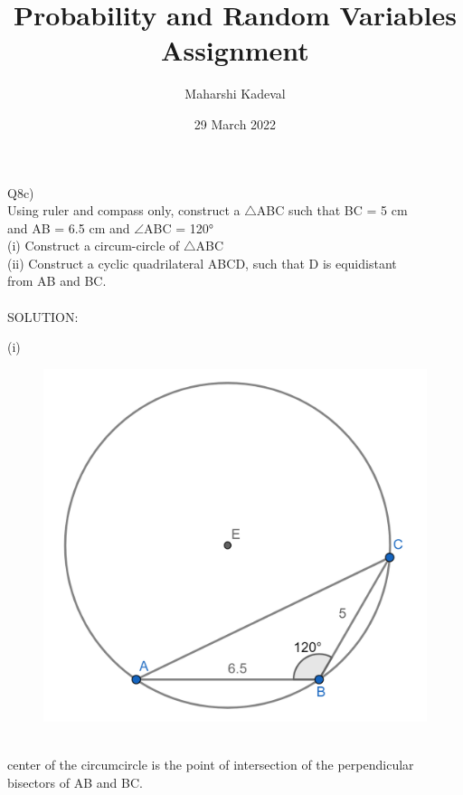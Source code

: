 \documentclass[12pt]{article}
\title{Probability and Random Variables Assignment}
\author{Maharshi Kadeval}
\date{29 March 2022}
\begin{document}
\maketitle

Q8c)\\
Using ruler and compass only, construct a $\bigtriangleup$ABC such that BC = 5 cm\\
and AB = 6.5 cm and $\angle$ABC = 120°\\
(i) Construct a circum-circle of $\bigtriangleup$ABC\\
(ii) Construct a cyclic quadrilateral ABCD, such that D is equidistant\\
from AB and BC.\\\\
SOLUTION:

(i)
\begin{figure}[!h]
\begin{center}
\includegraphics[scale=0.58]{fig1.png}\\
\end{center}
\end{figure}
\\
center of the circumcircle is the point of intersection of the perpendicular bisectors of AB and BC.
\end{document}
